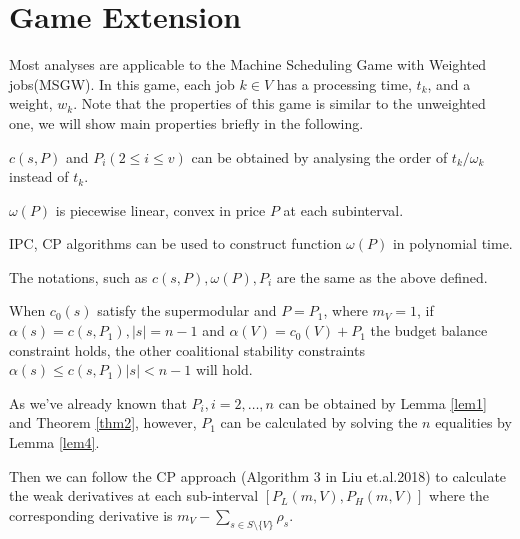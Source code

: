 \section{Game Extension}

Most analyses are applicable to the Machine Scheduling Game with Weighted jobs(MSGW).
In this game, each job $k \in V$ has a processing time, $t_k$, and a weight, $w_k$.
Note that the properties of this game is similar to the unweighted one, we will show main properties briefly in the following.

\begin{corollary} \label{cor-1}
$c(s,P)$ and $P_i(2 \leq i \leq v)$ can be obtained by analysing the order of $t_k/\omega_k$ instead of $t_k$.

\end{corollary}

\begin{corollary} \label{cor-2}
  $\omega(P)$ is piecewise linear, convex in price $P$ at each subinterval.
\end{corollary}

\begin{corollary} \label{cor-3}
  IPC, CP algorithms can be used to construct function $\omega(P)$ in polynomial time.
\end{corollary}

The notations, such as $c(s,P), \omega(P), P_i$ are the same as the above defined.

\begin{lem}\label{lem4}
When $c_0(s)$ satisfy the supermodular and $P=P_1$, where $m_V=1$, if $\alpha(s)=c(s, P_1), \left| s \right|= n-1$ and $\alpha(V)=c_0(V)+P_1$ the budget balance constraint holds, the other coalitional stability constraints $\alpha(s) \leq c(s, P_1) \left| s \right| < n-1$ will hold.
\end{lem}

As we've already known that $P_i, i = 2,\ldots,n$ can be obtained by Lemma \ref{lem1} and Theorem \ref{thm2}, however, $P_1$ can be calculated by solving the $n$ equalities by Lemma \ref{lem4}.

Then we can follow the CP approach (Algorithm 3 in Liu et.al.2018) to calculate the weak derivatives at each sub-interval $[P_L(m,V),P_H(m,V)]$ where the corresponding derivative is $m_V-\sum_{s\in S\setminus\{V\}} \rho_s$.

